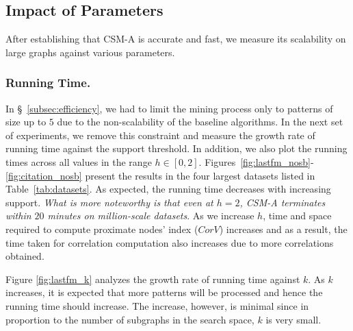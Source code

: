 \subsection{Impact of Parameters}
After establishing that {\sf CSM-A} is accurate and fast, we measure its scalability on large graphs against various parameters.

\vspace{-0.1in}
\subsubsection{Running Time.} In \S~\ref{subsec:efficiency}, we had to limit the mining process only to patterns of size up to $5$ due to the non-scalability of the baseline algorithms. In the next set of experiments, we remove this constraint and measure the growth rate of running time against the support threshold. In addition, we also plot the running times across all values in the range $h\in [0,2]$. Figures~\ref{fig:lastfm_nosb}-\ref{fig:citation_nosb} present the results in the four largest datasets listed in Table~\ref{tab:datasets}. As expected, the running time decreases with increasing support. {\em What is more noteworthy is that even at $h=2$, {\sf CSM-A} terminates within $20$ minutes on million-scale datasets}. As we increase $h$, time and space required to compute proximate nodes' index ($CorV$) increases and as a result, the time taken for correlation computation also increases due to more correlations obtained. %
%


Figure \ref{fig:lastfm_k} analyzes the growth rate of running time against $k$. As $k$ increases, it is expected that more patterns will be processed and hence the running time should increase. The increase, however, is minimal since in proportion to the number of subgraphs in the search space, $k$ is very small. %

